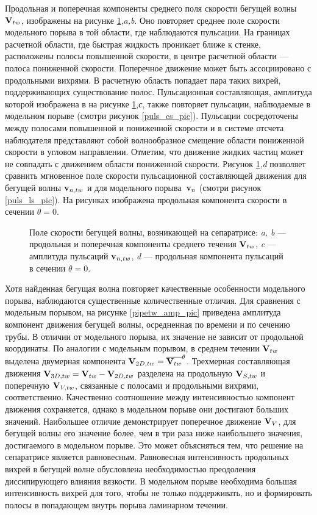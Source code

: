 Продольная и поперечная компоненты среднего поля скорости бегущей волны $\mathbf{V}_{tw}$, изображены на рисунке \ref{pipetw_pic},{\it a,b}. Оно повторяет среднее поле скорости модельного порыва в той области, где наблюдаются пульсации. На границах расчетной области, где быстрая жидкость проникает ближе к стенке, расположены полосы повышенной скорости, в центре расчетной области --- полоса пониженной скорости. Поперечное движение может быть ассоциировано с продольными вихрями. В расчетную область попадает пара таких вихрей, поддерживающих существование полос. Пульсационная составляющая, амплитуда которой изображена в на рисунке \ref{pipetw_pic},{\it с}, также повторяет пульсации, наблюдаемые в модельном порыве (смотри рисунок \ref{puls_cs_pic}). Пульсации сосредоточены между полосами повышенной и пониженной скорости и в системе отсчета наблюдателя представляют собой волнообразное смещение области пониженной скорости в угловом направлении. Отметим, что движение жидких частиц может не совпадать с движением области пониженной скорости. Рисунок \ref{pipetw_pic},{\it d} позволяет сравнить мгновенное поле скорости пульсационной составляющей движения для бегущей волны $\mathbf{v}_{n,tw}$ и для модельного порыва~$\mathbf{v}_n$ (смотри рисунок \ref{puls_ls_pic}). На рисунках изображена продольная компонента скорости в сечении $\theta = 0$. 
 

\begin{figure}
\caption{Поле скорости бегущей волны, возникающей на сепаратрисе: {\it a, b} --- продольная и поперечная компоненты среднего течения $\mathbf{V}_{tw}$, {\it c} --- амплитуда пульсаций $\mathbf{v}_{n,tw}$, {\it d} --- продольная компонента пульсаций в сечении $\theta = 0$.}
\label{pipetw_pic}
\end{figure}

Хотя найденная бегущая волна повторяет качественные особенности модельного порыва, наблюдаются существенные количественные отличия. Для сравнения с модельным порывом, на рисунке \ref{pipetw_amp_pic} приведена амплитуда компонент движения бегущей волны, осредненная по времени и по сечению трубы. В отличии от модельного порыва, их значение не зависит от продольной координаты. По аналогии с модельным порывом, в среднем течении $\mathbf{V}_{tw}$ выделена двумерная компонента $\mathbf{V}_{2D,tw} = \overline{\mathbf{V}_{tw}}^\theta$. Трехмерная составляющая движения $\mathbf{V}_{3D,tw} = \mathbf{V}_{tw} - \mathbf{V}_{2D,tw}$ разделена на продольную $\mathbf{V}_{S,tw}$ и поперечную $\mathbf{V}_{V,tw}$, связанные с полосами и продольными вихрями, соответственно. Качественно соотношение между интенсивностью компонент движения сохраняется, однако в модельном порыве они достигают больших значений. Наибольшее отличие демонстрирует поперечное движение $\mathbf{V}_V$, для бегущей волны его значение более, чем в три раза ниже наибольшего значения, достигаемого в модельном порыве. Это может объясняться тем, что решение на сепаратрисе является равновесным. Равновесная интенсивность продольных вихрей в бегущей волне обусловлена необходимостью преодоления диссипирующего влияния вязкости. В модельном порыве необходима большая интенсивность вихрей для того, чтобы не только поддерживать, но и формировать полосы в попадающем внутрь порыва ламинарном течении. 


